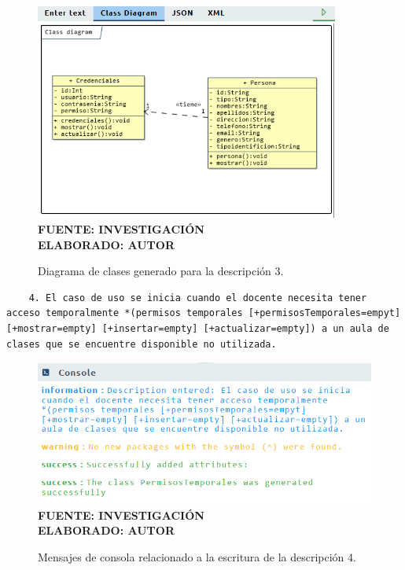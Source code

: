  \begin{figure}[H]
 	\centering
 	\caption{Diagrama de clases generado para la descripción 3.}
 	\includegraphics[width=10cm]{img/dc-eva-003.png}
 	\label{fig:dc_eva_003}
 	\vspace{4mm}
 	{\footnotesize \textbf{\\ FUENTE: INVESTIGACIÓN} \textbf{\\ ELABORADO: AUTOR}}
 \end{figure}
 
  \begin{lstlisting}
 	4. El caso de uso se inicia cuando el docente necesita tener acceso temporalmente *(permisos temporales [+permisosTemporales=empyt] [+mostrar=empty] [+insertar=empty] [+actualizar=empty]) a un aula de clases que se encuentre disponible no utilizada. \end{lstlisting}
 
   \begin{figure}[h!]
   	\centering
 	\caption{Mensajes de consola relacionado a la escritura de la descripción 4.}
 	\includegraphics[width=14cm]{img/not-eva-004.png}
 	\label{fig:not_eva_004}
 	\vspace{4mm}
 	{\footnotesize \textbf{\\ FUENTE: INVESTIGACIÓN} \textbf{\\ ELABORADO: AUTOR}}
 \end{figure}
 
